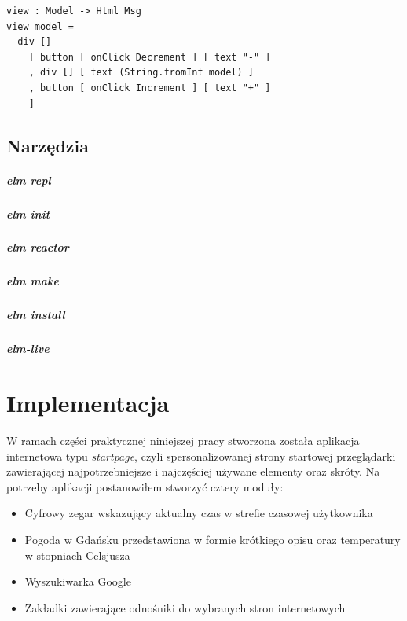 \documentclass[twoside,a4paper]{report}
\begin{document}
\lstset{frame=single}
\begin{lstlisting}[caption={\textit{The Elm Architecture} - View},label=kod:View]
view : Model -> Html Msg
view model =
  div []
    [ button [ onClick Decrement ] [ text "-" ]
    , div [] [ text (String.fromInt model) ]
    , button [ onClick Increment ] [ text "+" ]
    ]
\end{lstlisting}

\section{Narzędzia}

\paragraph{elm repl}

\paragraph{elm init}

\paragraph{elm reactor}

\paragraph{elm make}

\paragraph{elm install}

\paragraph{elm-live}\cite{elm-live}



\chapter{Implementacja}
W ramach części praktycznej niniejszej pracy stworzona została aplikacja internetowa typu \textit{startpage}, czyli spersonalizowanej strony startowej przeglądarki zawierającej najpotrzebniejsze i najczęściej używane elementy oraz skróty.
Na potrzeby aplikacji postanowiłem stworzyć cztery moduły:
\begin{itemize}
    \item Cyfrowy zegar wskazujący aktualny czas w strefie czasowej użytkownika
    \item Pogoda w Gdańsku przedstawiona w formie krótkiego opisu oraz temperatury w stopniach Celsjusza
    \item Wyszukiwarka Google
    \item Zakładki zawierające odnośniki do wybranych stron internetowych
\end{itemize}
\end{document}
